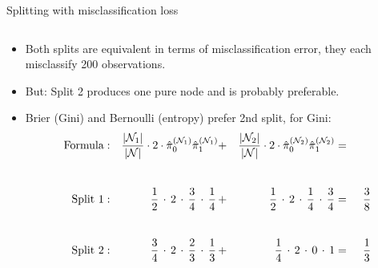 \documentclass[11pt,compress,t,notes=noshow, xcolor=table]{beamer}
\begin{document}
\begin{vbframe}{Splitting with misclassification loss}
\begin{small}
\begin{columns}[T,onlytextwidth]
\begin{center}
\end{center}
\end{columns}
\end{small}

\lz

\begin{itemize}
\item Both splits are equivalent in terms of misclassification error, they each misclassify 200 observations. 
\item But: Split 2 produces one pure node and is probably preferable.

\framebreak


\item Brier (Gini) and Bernoulli (entropy) prefer 2nd split, for Gini:\\
\begin{alignat*}{6}
\text{Formula}&:& \frac{|\Nl|}{|\Np|}\cdot 2 \cdot\pikNlh[0]\pikNlh[1] &+& \frac{|\Nr|}{|\Np|}\cdot 2 \cdot \pikNrh[0]\pikNrh[1] &=& \\[5ex]
\text{Split 1}&:& \,\, \frac{1}{2} \,\cdot \, 2 \,\cdot\, \frac{3}{4} \,\cdot\, \frac{1}{4} \,&+&\,  \, \frac{1}{2} \,\cdot\, 2 \, \cdot\, \frac{1}{4} \,\cdot\, \frac{3}{4} &=&\;\, \frac{3}{8}\\[5ex]
\text{Split 2}&:& \frac{3}{4}\, \cdot\, 2 \,\cdot\,\frac{2}{3}\,\cdot\,\frac{1}{3}\, &+& \frac{1}{4} \,\cdot\, 2 \,\cdot\, 0 \,\cdot\, 1 &=&\; \,\frac{1}{3}
\end{alignat*}
\end{itemize}
\end{vbframe}




\endlecture
\end{document}

